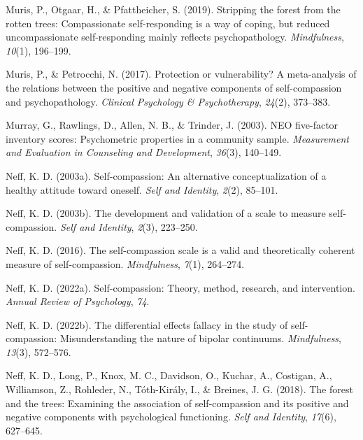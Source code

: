 \documentclass[
  man]{apa7}
\newlength{\cslhangindent}
\newlength{\cslentryspacingunit} %
\newenvironment{CSLReferences}[2] %
 {%
  \setlength{\parindent}{0pt}
  \ifodd #1
  \let\oldpar\par
  \def\par{\hangindent=\cslhangindent\oldpar}
  \fi
  \setlength{\parskip}{#2\cslentryspacingunit}
 }%
 {}
\begin{document}
\begin{CSLReferences}{1}{0}
\leavevmode{}%
Muris, P., Otgaar, H., \& Pfattheicher, S. (2019). Stripping the forest from the rotten trees: Compassionate self-responding is a way of coping, but reduced uncompassionate self-responding mainly reflects psychopathology. \emph{Mindfulness}, \emph{10}(1), 196--199.

\leavevmode{}%
Muris, P., \& Petrocchi, N. (2017). Protection or vulnerability? A meta-analysis of the relations between the positive and negative components of self-compassion and psychopathology. \emph{Clinical Psychology \& Psychotherapy}, \emph{24}(2), 373--383.

\leavevmode{}%
Murray, G., Rawlings, D., Allen, N. B., \& Trinder, J. (2003). NEO five-factor inventory scores: Psychometric properties in a community sample. \emph{Measurement and Evaluation in Counseling and Development}, \emph{36}(3), 140--149.

\leavevmode{}%
Neff, K. D. (2003a). Self-compassion: An alternative conceptualization of a healthy attitude toward oneself. \emph{Self and Identity}, \emph{2}(2), 85--101.

\leavevmode{}%
Neff, K. D. (2003b). The development and validation of a scale to measure self-compassion. \emph{Self and Identity}, \emph{2}(3), 223--250.

\leavevmode{}%
Neff, K. D. (2016). The self-compassion scale is a valid and theoretically coherent measure of self-compassion. \emph{Mindfulness}, \emph{7}(1), 264--274.

\leavevmode{}%
Neff, K. D. (2022a). Self-compassion: Theory, method, research, and intervention. \emph{Annual Review of Psychology}, \emph{74}.

\leavevmode{}%
Neff, K. D. (2022b). The differential effects fallacy in the study of self-compassion: Misunderstanding the nature of bipolar continuums. \emph{Mindfulness}, \emph{13}(3), 572--576.

\leavevmode{}%
Neff, K. D., Long, P., Knox, M. C., Davidson, O., Kuchar, A., Costigan, A., Williamson, Z., Rohleder, N., Tóth-Király, I., \& Breines, J. G. (2018). The forest and the trees: Examining the association of self-compassion and its positive and negative components with psychological functioning. \emph{Self and Identity}, \emph{17}(6), 627--645.


\end{CSLReferences}
\end{document}
